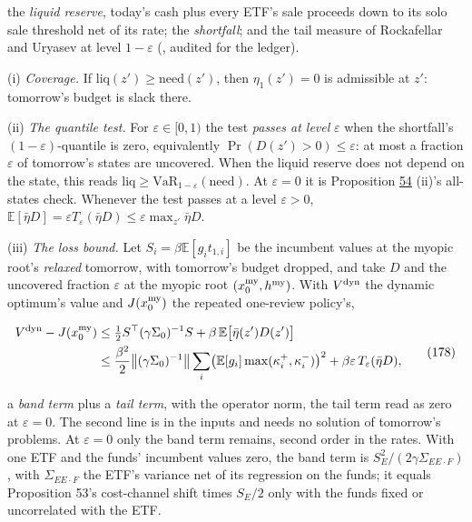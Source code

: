 \documentclass[11pt]{article}
\begin{document}
the \emph{liquid reserve}, today's cash plus every ETF's sale proceeds down to
its solo sale threshold net of its rate; the \emph{shortfall}; and the tail
measure of Rockafellar and Uryasev at level \(1-\varepsilon\)
(\cite{rockafellar2000optimization}, audited for the ledger).

(i) \emph{Coverage.} If \(\mathrm{liq}(z')\geq\mathrm{need}(z')\), then \(\eta_1(z')=0\) is admissible at
\(z'\): tomorrow's budget is slack there.

(ii) \emph{The quantile test.} For \(\varepsilon\in[0,1)\) the test \emph{passes at level} \(\varepsilon\)
when the shortfall's \((1-\varepsilon)\)-quantile is zero, equivalently
\(\Pr(D(z')>0)\leq\varepsilon\): at most a fraction \(\varepsilon\) of tomorrow's states are
uncovered. When the liquid reserve does not depend on the state, this
reads \(\mathrm{liq}\geq\mathrm{VaR}_{1-\varepsilon}(\mathrm{need})\). At \(\varepsilon=0\) it is Proposition \hyperref[res:Proposition-54]{54} (ii)'s
all-states check. Whenever the test passes at a level \(\varepsilon>0\),
\(\mathbb E[\bar\eta D]=\varepsilon T_\varepsilon(\bar\eta D)\leq\varepsilon\max_{z'}\bar\eta D\).

(iii) \emph{The loss bound.} Let \(S_i=\beta\mathbb E[g_it_{1,i}]\) be the incumbent values at
the myopic root's \emph{relaxed} tomorrow, with tomorrow's budget dropped,
and take \(D\) and the uncovered fraction \(\varepsilon\) at the myopic root
\((x^{\rm my}_0,h^{\rm my})\). With \(V^{\rm dyn}\) the dynamic optimum's value and \(J(x^{\rm my}_0)\)
the repeated one-review policy's,

\begin{equation*}
\begin{aligned}
V^{\rm dyn}-J(x^{\rm my}_0)&\leq\tfrac12S^\top(\gamma\Sigma_0)^{-1}S+\beta\,\mathbb E\bigl[\bar\eta(z')D(z')\bigr]\\
&\leq\frac{\beta^2}2\bigl\|(\gamma\Sigma_0)^{-1}\bigr\|\sum_i\bigl(\mathbb E[g_i]\max(\kappa^+_i,\kappa^-_i)\bigr)^2+\beta\varepsilon\,T_\varepsilon(\bar\eta D),
\end{aligned}\tag{178}\label{eq:178}
\end{equation*}

a \emph{band term} plus a \emph{tail term}, with the operator norm, the tail term
read as zero at \(\varepsilon=0\). The second line is in the inputs and needs no
solution of tomorrow's problems. At \(\varepsilon=0\) only the band term remains,
second order in the rates. With one ETF and the funds' incumbent
values zero, the band term is \(S_E^2/(2\gamma\Sigma_{EE\cdot F})\), with \(\Sigma_{EE\cdot F}\) the ETF's
variance net of its regression on the funds; it equals Proposition
53's cost-channel shift times \(S_E/2\) only with the funds fixed or
uncorrelated with the ETF.
\end{document}
